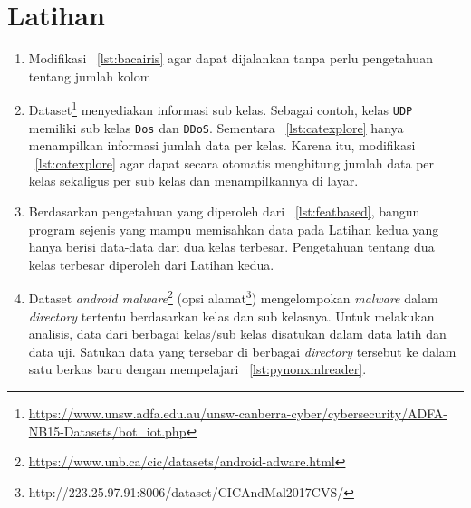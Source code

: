 \section{Latihan}
\begin{enumerate}
  \item Modifikasi \lstlistingname~\ref{lst:bacairis} agar dapat dijalankan tanpa perlu pengetahuan tentang jumlah kolom
  \item Dataset\footnote{\url{https://www.unsw.adfa.edu.au/unsw-canberra-cyber/cybersecurity/ADFA-NB15-Datasets/bot\_iot.php}} menyediakan informasi sub kelas. Sebagai contoh, kelas \texttt{UDP} memiliki sub kelas \texttt{Dos} dan \texttt{DDoS}. Sementara \lstlistingname~\ref{lst:catexplore} hanya menampilkan informasi jumlah data per kelas. Karena itu, modifikasi \lstlistingname~\ref{lst:catexplore} agar dapat secara otomatis menghitung jumlah data per kelas sekaligus per sub kelas dan menampilkannya di layar.
  \item Berdasarkan pengetahuan yang diperoleh dari \lstlistingname~\ref{lst:featbased}, bangun program sejenis yang mampu memisahkan data pada Latihan kedua yang hanya berisi data-data dari dua kelas terbesar. Pengetahuan tentang dua kelas terbesar diperoleh dari Latihan kedua.
  \item Dataset \textit{android malware}\footnote{\url{https://www.unb.ca/cic/datasets/android-adware.html}} (opsi alamat\footnote{http://223.25.97.91:8006/dataset/CICAndMal2017CVS/}) mengelompokan \textit{malware} dalam \textit{directory} tertentu berdasarkan kelas dan sub kelasnya. Untuk melakukan analisis, data dari berbagai kelas/sub kelas disatukan dalam data latih dan data uji. Satukan data yang tersebar di berbagai \textit{directory} tersebut ke dalam satu berkas baru dengan mempelajari \lstlistingname~\ref{lst:pynonxmlreader}.
\end{enumerate}
